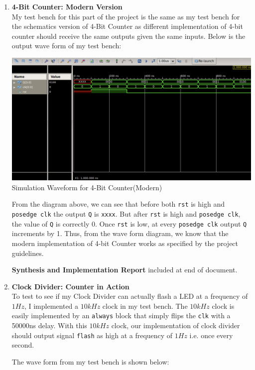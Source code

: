 \documentclass{article}
\begin{document}
\begin{enumerate}
    \item \textbf{4-Bit Counter: Modern Version} \\
    My test bench for this part of the project is the same as my test bench for the schematics version of 4-Bit Counter as different implementation of 4-bit counter should receive the same outputs given the same inputs. Below is the output wave form of my test bench:
    \begin{center}
        \includegraphics[scale=0.5]{tb_seq1.png} \\
        \caption{Simulation Waveform for 4-Bit Counter(Modern)}
    \end{center}
    From the diagram above, we can see that before both \texttt{rst} is high and \texttt{posedge clk} the output \texttt{Q} is \texttt{xxxx}. But after \texttt{rst} is high and \texttt{posedge clk}, the value of \texttt{Q} is correctly 0. Once \texttt{rst} is low, at every \texttt{posedge clk} output \texttt{Q} increments by 1. Thus, from the wave form diagram, we know that the modern implementation of 4-bit Counter works as specified by the project guidelines. \par
    \textbf{Synthesis and Implementation Report} included at end of document.
    \item \textbf{Clock Divider: Counter in Action} \\
    To test to see if my Clock Divider can actually flash a LED at a frequency of $1Hz$, I implemented a $10kHz$ clock in my test bench. The $10kHz$ clock is easily implemented by an \texttt{always} block that simply flips the \texttt{clk} with a 50000ns delay. With this $10kHz$ clock, our implementation of clock divider should output signal \texttt{flash} as high at a frequency of $1Hz$ i.e. once every second. \par
    The wave form from my test bench is shown below:
    \begin{center}

\end{center}
\end{enumerate}
\end{document}
